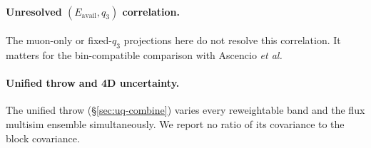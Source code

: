 \paragraph{Unresolved $(E_{\mathrm{avail}},q_{3})$ correlation.} The muon-only or fixed-$q_{3}$ projections here do not resolve this correlation. It matters for the bin-compatible comparison with Ascencio \emph{et al.}

\paragraph{Unified throw and 4D uncertainty.} The unified throw (\S\ref{sec:uq-combine}) varies every reweightable band and the flux multisim ensemble simultaneously. We report no ratio of its covariance to the block covariance.

